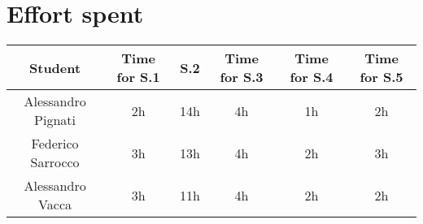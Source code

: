 \section{Effort spent}
\begin{tabular}{ | c || c | c | c | c | c|}
    \hline
    Student             & Time for S.1 & S.2 & Time for S.3 & Time for S.4 & Time for S.5 \\ \hline
    Alessandro Pignati  & 2h           & 14h  & 4h          & 1h           & 2h           \\ \hline
    Federico Sarrocco   & 3h           & 13h  & 4h          & 2h           & 3h           \\ \hline
    Alessandro Vacca    & 3h           & 11h  & 4h          & 2h           & 2h           \\
    \hline
\end{tabular}